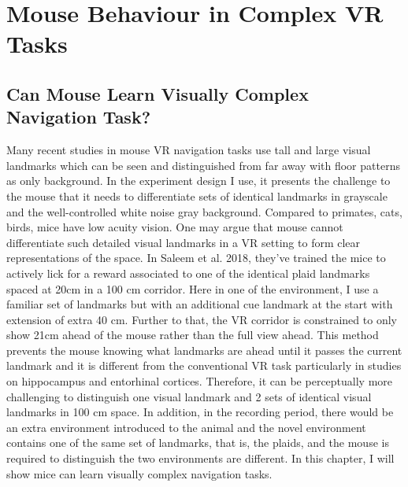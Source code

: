 \chapter{Mouse Behaviour in Complex VR Tasks}
\label{chapterlabel3}

\section{Can Mouse Learn Visually Complex Navigation Task?}
 Many recent studies in mouse VR navigation tasks use tall and large visual landmarks which can be seen and distinguished from far away with floor patterns as only background. In the experiment design I use, it presents the challenge to the mouse that it needs to differentiate sets of identical landmarks in grayscale and the well-controlled white noise gray background. Compared to primates, cats, birds, mice have low acuity vision. One may argue that mouse cannot differentiate such detailed visual landmarks in a VR setting to form clear representations of the space. In Saleem et al. 2018, they've trained the mice to actively lick for a reward associated to one of the identical plaid landmarks spaced at 20cm in a 100 cm corridor. Here in one of the environment, I use a familiar set of landmarks but with an additional cue landmark at the start with extension of extra 40 cm. Further to that, the VR corridor is constrained to only show 21cm ahead of the mouse rather than the full view ahead. This method prevents the mouse knowing what landmarks are ahead until it passes the current landmark and it is different from the conventional VR task particularly in studies on hippocampus and entorhinal cortices. Therefore, it can be perceptually more challenging to distinguish one visual landmark and 2 sets of identical visual landmarks in 100 cm space. In addition, in the recording period, there would be an extra environment introduced to the animal and the novel environment contains one of the same set of landmarks, that is, the plaids, and the mouse is required to distinguish the two environments are different. In this chapter, I will show mice can learn visually complex navigation tasks.
